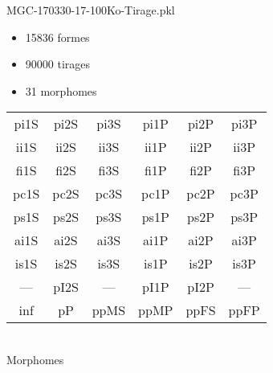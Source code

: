 MGC-170330-17-100Ko-Tirage.pkl
\begin{itemize}
\item 15836 formes
\item 90000 tirages
\item 31 morphomes
\end{itemize}
\begin{center}
\begin{tabular}{cccccc}
\hline
\cellcolor{white}pi1S & \cellcolor{orange}pi2S & \cellcolor{orange}pi3S & \cellcolor{white}pi1P & \cellcolor{white}pi2P & \cellcolor{white}pi3P\\
\cellcolor{brown}ii1S & \cellcolor{brown}ii2S & \cellcolor{brown}ii3S & \cellcolor{white}ii1P & \cellcolor{white}ii2P & \cellcolor{brown}ii3P\\
\cellcolor{yellow}fi1S & \cellcolor{lime}fi2S & \cellcolor{lime}fi3S & \cellcolor{green}fi1P & \cellcolor{white}fi2P & \cellcolor{green}fi3P\\
\cellcolor{yellow}pc1S & \cellcolor{yellow}pc2S & \cellcolor{yellow}pc3S & \cellcolor{white}pc1P & \cellcolor{white}pc2P & \cellcolor{yellow}pc3P\\
\cellcolor{teal}ps1S & \cellcolor{teal}ps2S & \cellcolor{teal}ps3S & \cellcolor{white}ps1P & \cellcolor{white}ps2P & \cellcolor{teal}ps3P\\
\cellcolor{white}ai1S & \cellcolor{lightgray}ai2S & \cellcolor{lightgray}ai3S & \cellcolor{white}ai1P & \cellcolor{pink}ai2P & \cellcolor{white}ai3P\\
\cellcolor{pink}is1S & \cellcolor{pink}is2S & \cellcolor{lightgray}is3S & \cellcolor{pink}is1P & \cellcolor{black}is2P & \cellcolor{pink}is3P\\
--- & \cellcolor{white}pI2S & --- & \cellcolor{white}pI1P & \cellcolor{white}pI2P & ---\\
\cellcolor{white}inf & \cellcolor{white}pP & \cellcolor{white}ppMS & \cellcolor{white}ppMP & \cellcolor{white}ppFS & \cellcolor{white}ppFP\\
\hline
\end{tabular}\\
Morphomes
\end{center}
\bigskip

